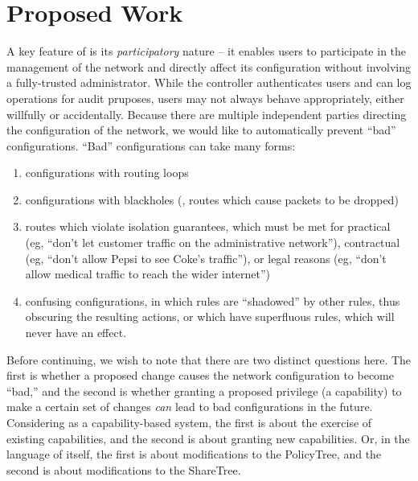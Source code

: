 

\chapter{Proposed Work}
\label{sec:proposed}

A key feature of \sys is its \emph{participatory} nature -- it enables
users to participate in the management of the network and directly affect its 
configuration without involving a fully-trusted administrator.
While the \sys controller authenticates users and can log operations for
audit pruposes, users may not always behave appropriately, either willfully 
or accidentally. Because there are multiple independent parties directing the 
configuration of the network, we would like to automatically prevent ``bad''
configurations. ``Bad'' configurations can take many forms:

{\singlespacing
\begin{enumerate}
\item configurations with routing loops 
\item configurations with blackholes (\ie, routes which cause packets to be dropped)
\item routes which violate isolation guarantees, which must be met for practical 
(eg, ``don't let customer traffic on the administrative network''), contractual 
(eg, ``don't allow Pepsi to see Coke's traffic''), or legal reasons (eg, ``don't 
allow medical traffic to reach the wider internet'')
\item confusing configurations, in which rules are ``shadowed'' by other rules, thus 
obscuring the resulting actions, or which have superfluous rules, which will 
never have an effect.
\end{enumerate}
}

Before continuing, we wish to note that there are two distinct questions here. 
The first is whether a proposed change causes the network configuration to 
become ``bad,'' and the second is whether granting a proposed privilege
(a capability) to make a certain set of changes \emph{can} lead to bad
configurations in the future. Considering \sys as a capability-based system, 
the first is about the exercise of existing capabilities, and the second is 
about granting new capabilities. Or, in the language of \sys itself, the first 
is about modifications to the PolicyTree, and the second is about modifications 
to the ShareTree.

